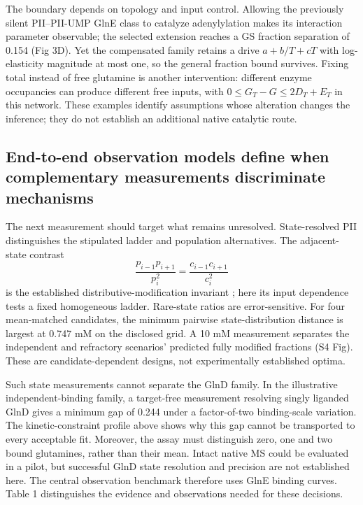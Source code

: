 \documentclass[10pt,letterpaper]{article}
\begin{document}
The boundary depends on topology and input control. Allowing the previously silent PII--PII-UMP GlnE class to catalyze adenylylation makes its interaction parameter observable; the selected extension reaches a GS fraction separation of 0.154 (Fig 3D). Yet the compensated family retains a drive $a+b/T+cT$ with log-elasticity magnitude at most one, so the general fraction bound survives. Fixing total instead of free glutamine is another intervention: different enzyme occupancies can produce different free inputs, with $0\leq G_T-G\leq2D_T+E_T$ in this network. These examples identify assumptions whose alteration changes the inference; they do not establish an additional native catalytic route.

\subsection*{End-to-end observation models define when complementary measurements discriminate mechanisms}

The next measurement should target what remains unresolved. State-resolved PII distinguishes the stipulated ladder and population alternatives. The adjacent-state contrast
\[
 \frac{p_{i-1}p_{i+1}}{p_i^2}=\frac{c_{i-1}c_{i+1}}{c_i^2}
\]
is the established distributive-modification invariant \cite{r76}; here its input dependence tests a fixed homogeneous ladder. Rare-state ratios are error-sensitive. For four mean-matched candidates, the minimum pairwise state-distribution distance is largest at 0.747 mM on the disclosed grid. A 10 mM measurement separates the independent and refractory scenarios' predicted fully modified fractions (S4 Fig). These are candidate-dependent designs, not experimentally established optima.

Such state measurements cannot separate the GlnD family. In the illustrative independent-binding family, a target-free measurement resolving singly liganded GlnD gives a minimum gap of 0.244 under a factor-of-two binding-scale variation. The kinetic-constraint profile above shows why this gap cannot be transported to every acceptable fit. Moreover, the assay must distinguish zero, one and two bound glutamines, rather than their mean. Intact native MS could be evaluated in a pilot, but successful GlnD state resolution and precision are not established here. The central observation benchmark therefore uses GlnE binding curves. Table 1 distinguishes the evidence and observations needed for these decisions.
\end{document}
